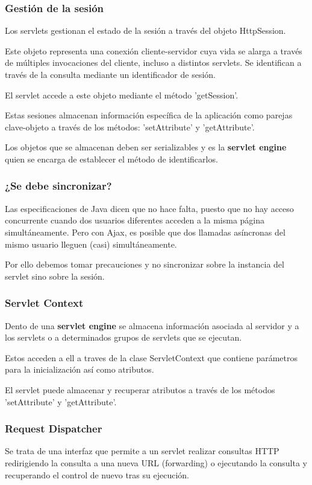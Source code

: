 \documentclass{apuntes}
\begin{document}
\subsubsection{Gestión de la sesión}
Los servlets gestionan el estado de la sesión a través del objeto HttpSession.

Este objeto representa una conexión cliente-servidor cuya vida se alarga a través de múltiples invocaciones del cliente, incluso a distintos servlets. Se identifican a través de la consulta mediante un identificador de sesión.

El servlet accede a este objeto mediante el método 'getSession'.

Estas sesiones almacenan información específica de la aplicación como parejas clave-objeto a través de los métodos: 'setAttribute' y 'getAttribute'.

Los objetos que se almacenan deben ser serializables y es la \textbf{servlet engine} quien se encarga de establecer el método de identificarlos.

\subsubsection{¿Se debe sincronizar?}
Las especificaciones de Java dicen que no hace falta, puesto que no hay acceso concurrente cuando dos usuarios diferentes acceden a la misma página simultáneamente. Pero con Ajax, es posible que dos llamadas asíncronas del mismo usuario lleguen (casi) simultáneamente.

Por ello debemos tomar precauciones y no sincronizar sobre la instancia del servlet sino sobre la sesión.

\subsubsection{Servlet Context}
Dento de una \textbf{servlet engine} se almacena información asociada al servidor y a los servlets o a determinados grupos de servlets que se ejecutan.

Estos acceden a ell a traves de la clase ServletContext que contiene parámetros para la inicialización así como atributos.

El servlet puede almacenar y recuperar atributos a través de los métodos 'setAttribute' y 'getAttribute'.

\subsubsection{Request Dispatcher}
Se trata de una interfaz que permite a un servlet realizar consultas HTTP redirigiendo la consulta a una nueva URL (forwarding) o ejecutando la consulta y recuperando el control de nuevo tras su ejecución.
\end{document}
